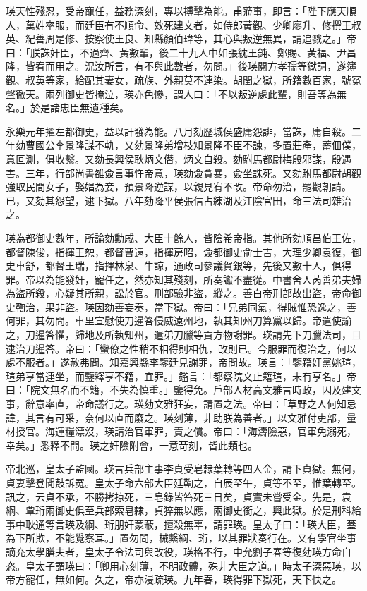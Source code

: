 \begin{pinyinscope}
瑛天性殘忍，受帝寵任，益務深刻，專以搏擊為能。甫蒞事，即言：「陛下應天順人，萬姓率服，而廷臣有不順命、效死建文者，如侍郎黃觀、少卿廖升、修撰王叔英、紀善周是修、按察使王良、知縣顏伯瑋等，其心與叛逆無異，請追戮之。」帝曰：「朕誅奸臣，不過齊、黃數輩，後二十九人中如張紞王鈍、鄭賜、黃福、尹昌隆，皆宥而用之。況汝所言，有不與此數者，勿問。」後瑛閱方孝孺等獄詞，遂簿觀、叔英等家，給配其妻女，疏族、外親莫不連染。胡閏之獄，所籍數百家，號冤聲徹天。兩列御史皆掩泣，瑛亦色慘，謂人曰：「不以叛逆處此輩，則吾等為無名。」於是諸忠臣無遺種矣。

永樂元年擢左都御史，益以訐發為能。八月劾歷城侯盛庸怨誹，當誅，庸自殺。二年劾曹國公李景隆謀不軌，又劾景隆弟增枝知景隆不臣不諫，多置莊產，蓄佃僕，意叵測，俱收繫。又劾長興侯耿炳文僭，炳文自殺。劾駙馬都尉梅殷邪謀，殷遇害。三年，行部尚書雒僉言事忤帝意，瑛劾僉貪暴，僉坐誅死。又劾駙馬都尉胡觀強取民間女子，娶娼為妾，預景降逆謀，以親見宥不改。帝命勿治，罷觀朝請。已，又劾其怨望，逮下獄。八年劾降平侯張信占練湖及江陰官田，命三法司雜治之。

瑛為都御史數年，所論劾勳戚、大臣十餘人，皆陰希帝指。其他所劾順昌伯王佐，都督陳俊，指揮王恕，都督曹遠，指揮房昭，僉都御史俞士吉，大理少卿袁復，御史車舒，都督王瑞，指揮林泉、牛諒，通政司參議賀銀等，先後又數十人，俱得罪。帝以為能發奸，寵任之，然亦知其殘刻，所奏讞不盡從。中書舍人芮善弟夫婦為盜所殺，心疑其所親，訟於官。刑部驗非盜，縱之。善白帝刑部故出盜，帝命御史鞫治，果非盜。瑛因劾善妄奏，當下獄。帝曰：「兄弟同氣，得賊惟恐逸之，善何罪，其勿問。車里宣慰使刀暹答侵威遠州地，執其知州刀算黨以歸。帝遣使諭之，刀暹答懼，歸地及所執知州，遣弟刀臘等貢方物謝罪。瑛請先下刀臘法司，且逮治刀暹答。帝曰：「蠻僚之性稍不相得則相仇，改則已。今服罪而復治之，何以處不服者。」遂赦弗問。知嘉興縣李鑒廷見謝罪，帝問故。瑛言：「鑒籍奸黨姚瑄，瑄弟亨當連坐，而鑒釋亨不籍，宜罪。」鑑言：「都察院文止籍瑄，未有亨名。」帝曰：「院文無名而不籍，不失為慎重。」鑒得免。戶部人材高文雅言時政，因及建文事，辭意率直，帝命議行之。瑛劾文雅狂妄，請置之法。帝曰：「草野之人何知忌諱，其言有可采，奈何以直而廢之。瑛刻薄，非助朕為善者。」以文雅付吏部，量材授官。海運糧漂沒，瑛請治官軍罪，責之償。帝曰：「海濤險惡，官軍免溺死，幸矣。」悉釋不問。瑛之奸險附會，一意苛刻，皆此類也。

帝北巡，皇太子監國。瑛言兵部主事李貞受皂隸葉轉等四人金，請下貞獄。無何，貞妻擊登聞鼓訴冤。皇太子命六部大臣廷鞫之，自辰至午，貞等不至，惟葉轉至。訊之，云貞不承，不勝拷掠死，三皂錄皆笞死三日矣，貞實未嘗受金。先是，袁綱、覃珩兩御史俱至兵部索皂隸，貞猝無以應，兩御史銜之，興此獄。於是刑科給事中耿通等言瑛及綱、珩朋奸蒙蔽，擅殺無辜，請罪瑛。皇太子曰：「瑛大臣，蓋為下所欺，不能覺察耳。」置勿問，械繫綱、珩，以其罪狀奏行在。又有學官坐事謫充太學膳夫者，皇太子令法司與改役，瑛格不行，中允劉子春等復劾瑛方命自恣。皇太子謂瑛曰：「卿用心刻薄，不明政體，殊非大臣之道。」時太子深惡瑛，以帝方寵任，無如何。久之，帝亦浸疏瑛。九年春，瑛得罪下獄死，天下快之。


\end{pinyinscope}
